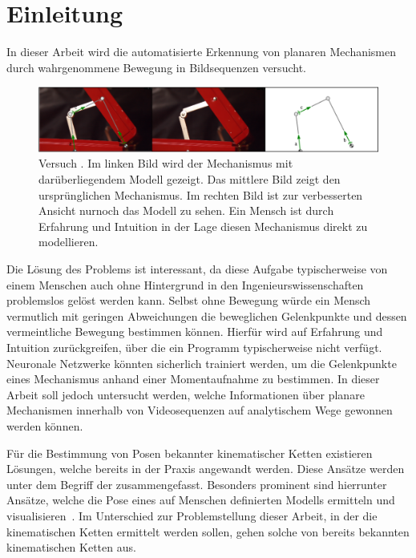 %

\chapter{Einleitung}
\label{ch:einleitung}

In dieser Arbeit wird die automatisierte Erkennung von planaren Mechanismen durch wahrgenommene Bewegung in Bildsequenzen versucht.

\begin{figure}
\centering
    \includegraphics[width=\textwidth]{gfx/werkzeugkoffer_impl.png}
    \caption[Versuch ]{Versuch . Im linken Bild wird der Mechanismus mit darüberliegendem  Modell gezeigt. Das mittlere Bild zeigt den ursprünglichen Mechanismus. Im rechten Bild ist zur verbesserten Ansicht nurnoch das  Modell zu sehen. Ein Mensch ist durch Erfahrung und Intuition in der Lage diesen Mechanismus direkt zu modellieren.}
    \label{fig:werkzeugkoffer_impl}
\end{figure}

Die Lösung des Problems ist interessant, da diese Aufgabe typischerweise von einem Menschen auch ohne Hintergrund in den Ingenieurswissenschaften problemslos gelöst werden kann.
Selbst ohne Bewegung würde ein Mensch vermutlich mit geringen Abweichungen die beweglichen Gelenkpunkte und dessen vermeintliche Bewegung bestimmen können.
Hierfür wird auf Erfahrung und Intuition zurückgreifen, über die ein Programm typischerweise nicht verfügt.
Neuronale Netzwerke könnten sicherlich trainiert werden, um die Gelenkpunkte eines Mechanismus anhand einer Momentaufnahme zu bestimmen.
In dieser Arbeit soll jedoch untersucht werden, welche Informationen über planare Mechanismen innerhalb von Videosequenzen auf analytischem Wege gewonnen werden können.

Für die Bestimmung von Posen bekannter kinematischer Ketten existieren Lösungen, welche bereits in der Praxis angewandt werden.
Diese Ansätze werden unter dem Begriff der  zusammengefasst.
Besonders prominent sind hierrunter Ansätze, welche die Pose eines auf Menschen definierten Modells ermitteln und visualisieren~\cite{Papandreou2018, Google2021, Google2021a}.
Im Unterschied zur Problemstellung dieser Arbeit, in der die kinematischen Ketten ermittelt werden sollen, gehen solche von bereits bekannten kinematischen Ketten aus.

